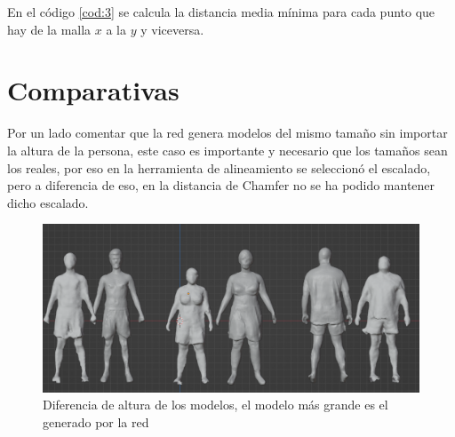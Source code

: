 En el código \ref{cod:3} se calcula la distancia media mínima para cada punto que hay de la malla $x$ a la $y$ y viceversa.
\clearpage

\section{Comparativas}

Por un lado comentar que la red genera modelos del mismo tamaño sin importar la altura de la persona, este caso es importante y necesario que los tamaños sean los reales, por eso en la herramienta de alineamiento se seleccionó el escalado, pero a diferencia de eso, en la distancia de Chamfer no se ha podido mantener dicho escalado.

\begin{figure}[H]
	\centering
	\includegraphics[scale=0.4]{imagenes/difaltura.png}
	\caption{Diferencia de altura de los modelos, el modelo más grande es el generado por la red}
	\label{fig:figura12}
\end{figure}






